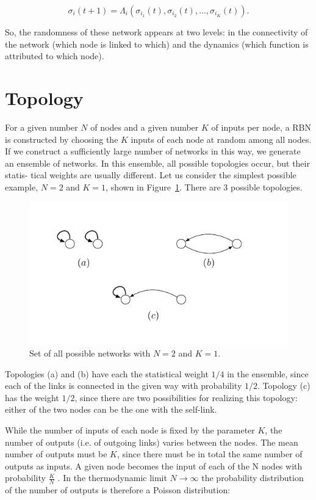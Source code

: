 \begin{equation}
\sigma_i(t+1)=\Lambda_i(\sigma_{i_1}(t),\sigma_{i_2}(t), ...,\sigma_{i_K}(t)).
\end{equation}  

So, the randomness of these network appears at two levels: in the connectivity of the network (which node is linked
to which) and the dynamics (which function is attributed to which node).

\section{Topology}
For a given number $N$ of nodes and a given number
$K$ of inputs per node, a RBN is constructed by choosing
the $K$ inputs of each node at random among all nodes.
If we construct a sufficiently large number of networks in
this way, we generate an ensemble of networks. In this
ensemble, all possible topologies occur, but their statis-
tical weights are usually different. Let us consider the
simplest possible example, $N = 2$ and $K = 1$, shown
in Figure~\ref{fig:rb}. There are 3 possible topologies.



\begin{figure}[h]
\centering
\includegraphics[scale=1.3]{figurenetworks.pdf}
\caption{Set of all possible networks with $N=2$ and $K=1$.}
\label{fig:rb}
\end{figure}

Topologies (a) and (b) have each the statistical weight $1/4$ in
the ensemble, since each of the links is connected in the
given way with probability $1/2$. Topology (c) has the
weight $1/2$, since there are two possibilities for realizing
this topology: either of the two nodes can be the one
with the self-link.


While the number of inputs of each node is fixed by
the parameter $K$, the number of outputs (i.e. of outgoing links) varies between the nodes. The mean number of
outputs must be $K$, since there must be in total the same
number of outputs as inputs. A given node becomes the
input of each of the N nodes with probability $\frac{K}{N}$ . In
the thermodynamic limit $N \to \infty$ the probability distribution of the number of outputs is therefore a Poisson
distribution:

